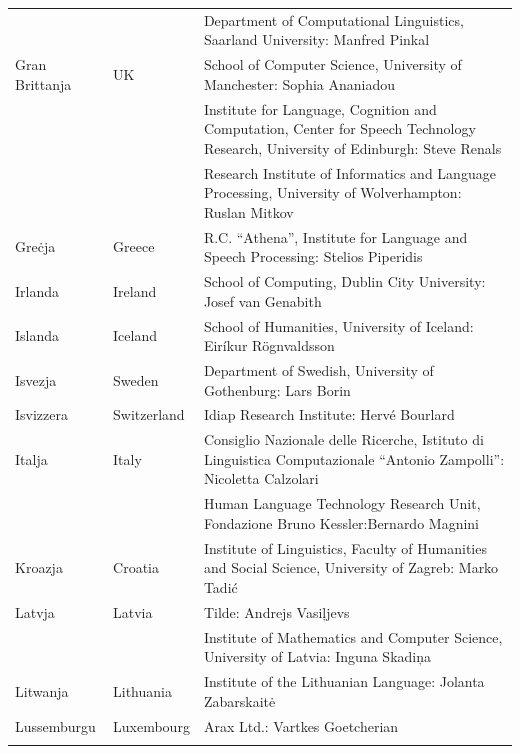 \begin{longtable}{@{}llp{113mm}@{}}
  & & Department of Computational Linguistics, Saarland University: Manfred Pinkal\\ \addlinespace 
  Gran Brittanja & \textcolor{grey1}{UK} & 
  School of Computer Science, University of Manchester: Sophia Ananiadou \\ \addlinespace 
  & & Institute for Language, Cognition and Computation, Center for Speech Technology Research, University of Edinburgh: Steve Renals \\ \addlinespace 
  & & Research Institute of Informatics and Language Processing, University of Wolverhampton: Ruslan Mitkov \\ \addlinespace 
  Greċja & \textcolor{grey1}{Greece} & R.C. “Athena”, Institute for Language and Speech Processing: Stelios Piperidis\\ \addlinespace
  Irlanda & \textcolor{grey1}{Ireland} & School of Computing, Dublin City University: Josef van Genabith\\ \addlinespace
  Islanda & \textcolor{grey1}{Iceland} & School of Humanities, University of Iceland: Eiríkur Rögnvaldsson\\ \addlinespace
  Isvezja & \textcolor{grey1}{Sweden} & Department of Swedish, University of Gothenburg: Lars Borin \\ \addlinespace 
  Isvizzera & \textcolor{grey1}{Switzerland} & Idiap Research Institute: Hervé Bourlard \\ \addlinespace 
  Italja & \textcolor{grey1}{Italy} & Consiglio Nazionale delle Ricerche, Istituto di Linguistica Computazionale “Antonio Zampolli”: Nicoletta Calzolari\\ \addlinespace
  & & Human Language Technology Research Unit, Fondazione Bruno Kessler:\newline Bernardo Magnini\\ \addlinespace 
  Kroazja & \textcolor{grey1}{Croatia} & Institute of Linguistics, Faculty of Humanities and Social Science, University of Zagreb: Marko Tadić \\ \addlinespace
  Latvja & \textcolor{grey1}{Latvia} & Tilde: Andrejs Vasiļjevs\\ \addlinespace 
  & & Institute of Mathematics and Computer Science, University of Latvia: Inguna Skadiņa\\ \addlinespace
  Litwanja & \textcolor{grey1}{Lithuania} & Institute of the Lithuanian Language: Jolanta Zabarskaitė\\ \addlinespace
  Lussemburgu & \textcolor{grey1}{Luxembourg} & Arax Ltd.: Vartkes Goetcherian\\ \addlinespace

\end{longtable}
